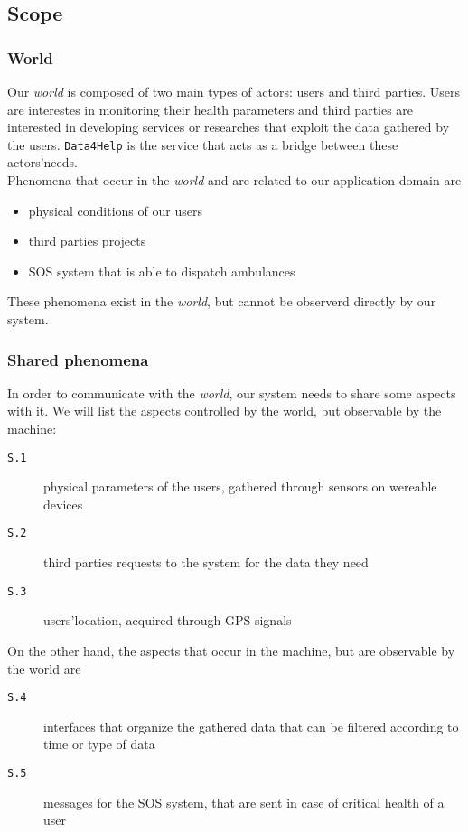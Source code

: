 
  \subsection{Scope}

    \subsubsection{World}

      Our \textit{world} is composed of two main types of actors: users and third parties. Users are interestes in monitoring their health parameters and third parties are interested in developing services or researches that exploit the data gathered by the users. \texttt{Data4Help} is the service that acts as a bridge between these actors'needs. \\
      Phenomena that occur in the \textit{world} and are related to our application domain are
      \begin{itemize}
        \item physical conditions of our users
        \item third parties projects
        \item SOS system that is able to dispatch ambulances
      \end{itemize}
      These phenomena exist in the \textit{world}, but cannot be observerd directly by our system.

    \subsubsection{Shared phenomena}
    \label{sec:sharedp}

      In order to communicate with the \textit{world}, our system needs to share some aspects with it. We will list the aspects controlled by the world, but observable by the machine:
      \begin{description}
        \item[\texttt{S.1}] physical parameters of the users, gathered through sensors on wereable devices
        \item[\texttt{S.2}] third parties requests to the system for the data they need
        \item[\texttt{S.3}] users'location, acquired through GPS signals
      \end{description}
      On the other hand, the aspects that occur in the machine, but are observable by the world are
      \begin{description}
        \item[\texttt{S.4}] interfaces that organize the gathered data that can be filtered according to time or type of data
        \item[\texttt{S.5}] messages for the SOS system, that are sent in case of critical health of a user
      \end{description}

